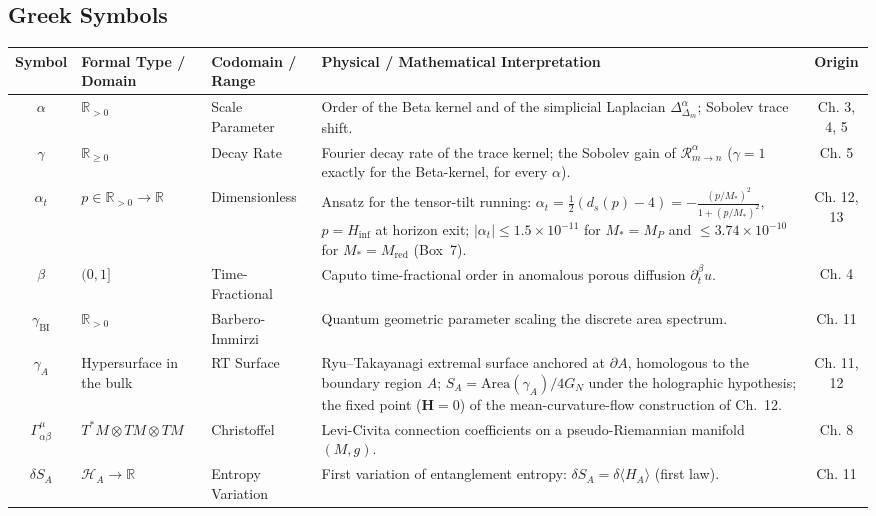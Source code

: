 \documentclass[11pt,a4paper,oneside]{article}
\begin{document}
\subsection{Greek Symbols}
\begin{table}[!htbp]
\centering
\scriptsize
\renewcommand{\arraystretch}{1.2}
\begin{tabularx}{\textwidth}{@{} c p{3.0cm} p{2.6cm} X c @{}}
\toprule
\textbf{Symbol} & \textbf{Formal Type / Domain} & \textbf{Codomain / Range} & \textbf{Physical / Mathematical Interpretation} & \textbf{Origin} \\
\midrule
$\alpha$ & $\mathbb{R}_{>0}$ & Scale Parameter & Order of the Beta kernel and of the simplicial Laplacian $\Delta_{\Delta_m}^\alpha$; Sobolev trace shift. & Ch. 3, 4, 5 \\
$\gamma$ & $\mathbb{R}_{\ge 0}$ & Decay Rate & Fourier decay rate of the trace kernel; the Sobolev gain of $\mathcal{R}_{m\to n}^\alpha$ ($\gamma = 1$ exactly for the Beta-kernel, for every $\alpha$). & Ch. 5 \\
$\alpha_t$ & $p \in \mathbb{R}_{>0} \to \mathbb{R}$ & Dimensionless & Ansatz for the tensor-tilt running: $\alpha_t = \frac{1}{2}(d_s(p) - 4) = -\frac{(p/M_\ast)^2}{1 + (p/M_\ast)^2}$, $p = H_{\mathrm{inf}}$ at horizon exit; $|\alpha_t| \le 1.5 \times 10^{-11}$ for $M_\ast = M_P$ and $\le 3.74 \times 10^{-10}$ for $M_\ast = M_{\mathrm{red}}$ (Box~7). & Ch. 12, 13 \\
$\beta$ & $(0,1]$ & Time-Fractional & Caputo time-fractional order in anomalous porous diffusion $\partial_t^\beta u$. & Ch. 4 \\
$\gamma_{\mathrm{BI}}$ & $\mathbb{R}_{>0}$ & Barbero-Immirzi & Quantum geometric parameter scaling the discrete area spectrum. & Ch. 11 \\
$\gamma_A$ & Hypersurface in the bulk & RT Surface & Ryu--Takayanagi extremal surface anchored at $\partial A$, homologous to the boundary region $A$; $S_A = \mathrm{Area}(\gamma_A)/4G_N$ under the holographic hypothesis; the fixed point ($\mathbf{H} = 0$) of the mean-curvature-flow construction of Ch.~12. & Ch. 11, 12 \\
$\Gamma^\mu_{\alpha\beta}$ & $T^*M \otimes TM \otimes TM$ & Christoffel & Levi-Civita connection coefficients on a pseudo-Riemannian manifold $(M, g)$. & Ch. 8 \\
$\delta S_A$ & $\mathcal{H}_A \to \mathbb{R}$ & Entropy Variation & First variation of entanglement entropy: $\delta S_A = \delta\langle H_A\rangle$ (first law). & Ch. 11 \\

\end{tabularx}
\end{table}
\end{document}
